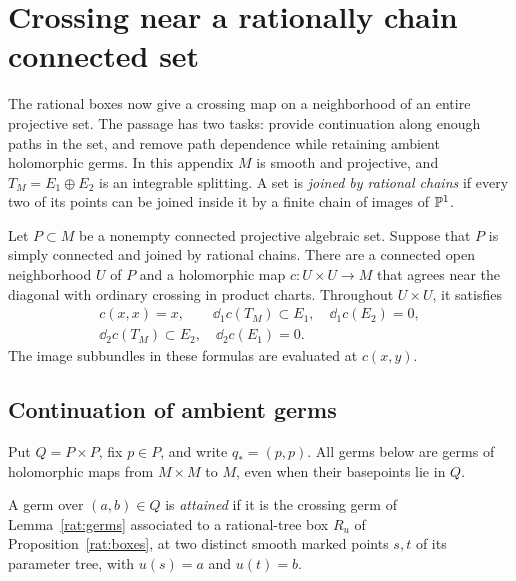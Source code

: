 \section{Crossing near a rationally chain connected set}\label{app:crossing}

The rational boxes now give a crossing map on a neighborhood of an
entire projective set. The passage has two tasks: provide continuation
along enough paths in the set, and remove path dependence while retaining
ambient holomorphic germs. In this appendix \(M\) is smooth and projective, and
\(T_M=E_1\oplus E_2\) is an integrable splitting. A set is
\emph{joined by rational chains} if every two of its points can be
joined inside it by a finite chain of images of \(\mathbb P^1\).

\begin{theorem}\label{thm:crossing}
Let \(P\subset M\) be a nonempty connected projective algebraic set.
Suppose that \(P\) is simply connected and joined by rational chains.
There are a connected open neighborhood \(U\) of \(P\) and a holomorphic
map \(c:U\times U\to M\) that agrees near the diagonal with ordinary
crossing in product charts. Throughout \(U\times U\), it satisfies
\begin{equation}\label{cross:identities}
\begin{gathered}
 c(x,x)=x,\qquad
 \dd_1c(T_M)\subset E_1,\quad \dd_1c(E_2)=0,\\
 \dd_2c(T_M)\subset E_2,\quad \dd_2c(E_1)=0.
\end{gathered}
\end{equation}
The image subbundles in these formulas are evaluated at \(c(x,y)\).
\end{theorem}

\subsection{Continuation of ambient germs}

Put \(Q=P\times P\), fix \(p\in P\), and write \(q_*=(p,p)\).
All germs below are germs of holomorphic maps from \(M\times M\) to \(M\),
even when their basepoints lie in \(Q\).

\begin{definition}\label{cross:attained}
A germ over \((a,b)\in Q\) is \emph{attained} if it is the crossing germ
of Lemma~\ref{rat:germs} associated to a rational-tree box \(R_u\) of
Proposition~\ref{rat:boxes}, at two distinct smooth marked points \(s,t\) of
its parameter tree, with \(u(s)=a\) and \(u(t)=b\).
\end{definition}

